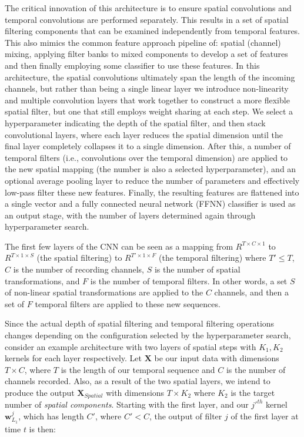 \documentclass[fleqn,10pt]{wlscirep}
\begin{document}
The critical innovation of this architecture is to ensure spatial convolutions and temporal convolutions are performed separately. This results in a set of spatial filtering components that can be examined independently from temporal features. This also mimics the common feature approach pipeline of: spatial (channel) mixing, applying filter banks to mixed components to develop a set of features and then finally employing some classifier to use these features. In this architecture, the spatial convolutions ultimately span the length of the incoming channels, but rather than being a single linear layer we introduce non-linearity and multiple convolution layers that work together to construct a more flexible spatial filter, but one that still employs weight sharing at each step. We select a hyperparameter indicating the depth of the spatial filter, and then stack convolutional layers, where each layer reduces the spatial dimension until the final layer completely collapses it to a single dimension. After this, a number of temporal filters (i.e., convolutions over the temporal dimension) are applied to the new spatial mapping (the number is also a selected hyperparameter), and an optional average pooling layer to reduce the number of parameters and effectively low-pass filter these new features. Finally, the resulting features are flattened into a single vector and a fully connected neural network (FFNN) classifier is used as an output stage, with the number of layers determined again through hyperparameter search.

The first few layers of the CNN can be seen as a mapping from $R^{T \times C \times 1}$ to $R^{T \times 1 \times S}$ (the spatial filtering) to $R^{T' \times 1 \times F }$ (the temporal filtering) where $T' \leq T$, $C$ is the number of recording channels, $S$ is the number of spatial transformations, and $F$ is the number of temporal filters. In other words, a set $S$ of non-linear spatial transformations are applied to the $C$ channels, and then a set of $F$ temporal filters are applied to these new sequences.

Since the actual depth of spatial filtering and temporal filtering operations changes depending on the configuration selected by the hyperparameter search, consider an example architecture with two layers of spatial steps with $K_1, K_2$ kernels for each layer respectively. Let $\boldsymbol{X}$ be our input data with dimensions $T \times C$, where $T$ is the length of our temporal sequence and $C$ is the number of channels recorded. Also, as a result of the two spatial layers, we intend to produce the output $\boldsymbol{X}_{Spatial}$ with dimensions $T \times K_2$ where $K_2$ is the target number of {\em spatial components}. Starting with the first layer, and our $j'^{th}$ kernel $\boldsymbol{w}_{L_1}^j$, which has length $C'$, where $C' < C$, the output of filter $j$ of the first layer at time $t$ is then:
\end{document}
